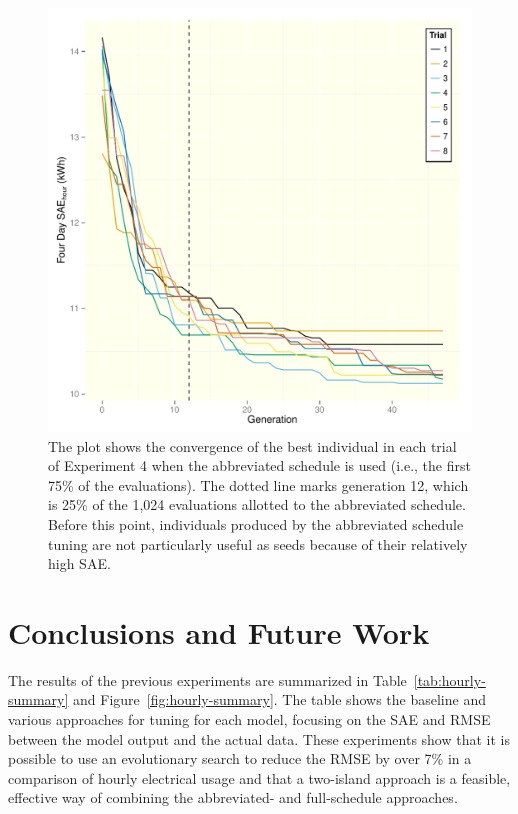 \documentclass[preprint, review, 12pt]{elsarticle}
\begin{document}
\begin{figure}[htbp]
\centering
\includegraphics[width=5in]{graphics/figure2.pdf}
\caption{The plot shows the convergence of the best individual in each trial of Experiment 4 when the abbreviated schedule is used (i.e., the first 75\% of the evaluations). The dotted line marks generation 12, which is 25\% of the 1,024 evaluations allotted to the abbreviated schedule. Before this point, individuals produced by the abbreviated schedule tuning are not particularly useful as seeds because of their relatively high SAE.}
\label{fig:hour-converge}
\end{figure}


\section{Conclusions and Future Work}
\label{sec:conclusions}
The results of the previous experiments are summarized in Table~\ref{tab:hourly-summary} and Figure~\ref{fig:hourly-summary}. The table shows the baseline and various approaches for tuning for each model, focusing on the SAE and RMSE between the model output and the actual data. These experiments show that it is possible to use an evolutionary search to reduce the RMSE by over 7\% in a  comparison of hourly electrical usage and that a two-island approach is a feasible, effective way of combining the abbreviated- and full-schedule approaches. 
\end{document}
